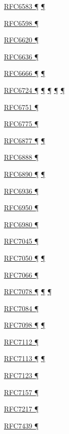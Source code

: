 \documentclass[
]{article}
\begin{document}
\hyperref[address-resolution]{RFC6583 ¶}
\hyperref[layer-2-considerations]{¶}

\hyperref[address-planning]{RFC6598 ¶}

\hyperref[layer-2-considerations]{RFC6620 ¶}

\hyperref[address-resolution]{RFC6636 ¶}

\hyperref[addresses]{RFC6666 ¶} \hyperref[filtering]{¶}

\hyperref[how-an-application-programmer-sees-ipv6]{RFC6724 ¶}
\hyperref[dns]{¶} \hyperref[source-and-destination-address-selection]{¶}
\hyperref[multi-prefix-operation]{¶}
\hyperref[obsolete-features-in-ipv6]{¶}

\hyperref[obsolete-techniques]{RFC6751 ¶}

\hyperref[address-resolution]{RFC6775 ¶}

\hyperref[dual-stack-scenarios]{RFC6877 ¶}
\hyperref[translation-and-ipv4-as-a-service]{¶}

\hyperref[dual-stack-scenarios]{RFC6888 ¶}

\hyperref[addresses]{RFC6890 ¶} \hyperref[filtering]{¶}

\hyperref[transport-protocols]{RFC6936 ¶}

\hyperref[multi-prefix-operation]{RFC6950 ¶}

\hyperref[obsolete-features-in-ipv6]{RFC6980 ¶}

\hyperref[filtering]{RFC7045 ¶}

\hyperref[obsolete-techniques]{RFC7050 ¶}
\hyperref[translation-and-ipv4-as-a-service]{¶}

\hyperref[managed-configuration]{RFC7066 ¶}

\hyperref[dns]{RFC7078 ¶}
\hyperref[source-and-destination-address-selection]{¶}
\hyperref[multi-prefix-operation]{¶}

\hyperref[routing]{RFC7084 ¶}

\hyperref[traffic-class-and-flow-label]{RFC7098 ¶}
\hyperref[topology-obfuscation]{¶}

\hyperref[layer-2-considerations]{RFC7112 ¶}

\hyperref[layer-2-considerations]{RFC7113 ¶}
\hyperref[obsolete-features-in-ipv6]{¶}

\hyperref[filtering]{RFC7123 ¶}

\hyperref[multihoming]{RFC7157 ¶}

\hyperref[security-operation]{RFC7217 ¶}

\hyperref[tunnels]{RFC7439 ¶}
\end{document}
